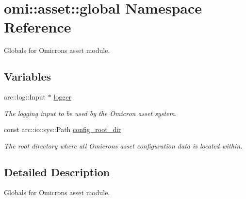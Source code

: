 \hypertarget{namespaceomi_1_1asset_1_1global}{}\section{omi\+:\+:asset\+:\+:global Namespace Reference}
\label{namespaceomi_1_1asset_1_1global}


Globals for Omicron\textquotesingle{}s asset module.  


\subsection*{Variables}
\begin{DoxyCompactItemize}
\item 
arc\+::log\+::\+Input $\ast$ \hyperlink{namespaceomi_1_1asset_1_1global_ae52188e7280eea518c79cc6bebf7de6e}{logger}\hypertarget{namespaceomi_1_1asset_1_1global_ae52188e7280eea518c79cc6bebf7de6e}{}\label{namespaceomi_1_1asset_1_1global_ae52188e7280eea518c79cc6bebf7de6e}

\begin{DoxyCompactList}\small\item\em The logging input to be used by the Omicron asset system. \end{DoxyCompactList}\item 
const arc\+::io\+::sys\+::\+Path \hyperlink{namespaceomi_1_1asset_1_1global_a99d9deb4d764e55094411b9c1f760a3e}{config\+\_\+root\+\_\+dir}\hypertarget{namespaceomi_1_1asset_1_1global_a99d9deb4d764e55094411b9c1f760a3e}{}\label{namespaceomi_1_1asset_1_1global_a99d9deb4d764e55094411b9c1f760a3e}

\begin{DoxyCompactList}\small\item\em The root directory where all Omicron\textquotesingle{}s asset configuration data is located within. \end{DoxyCompactList}\end{DoxyCompactItemize}


\subsection{Detailed Description}
Globals for Omicron\textquotesingle{}s asset module. 